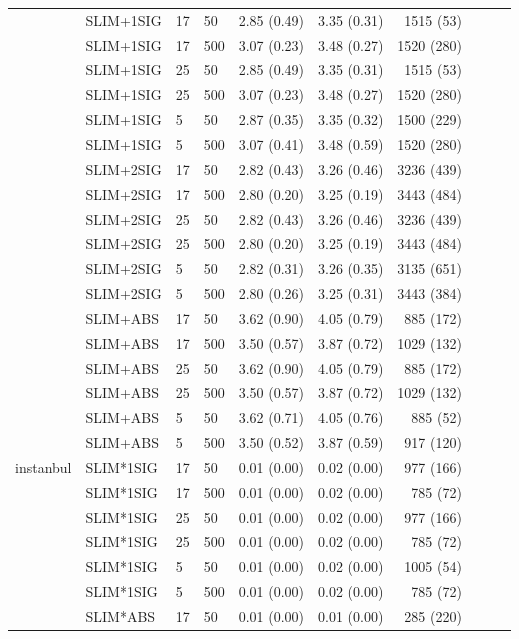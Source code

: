 \begin{longtable}{llllrrrrrr}
 & SLIM+1SIG & 17 & 50 & 2.85 (0.49) & 3.35 (0.31) & 1515 (53) \\
 & SLIM+1SIG & 17 & 500 & 3.07 (0.23) & 3.48 (0.27) & 1520 (280) \\
 & SLIM+1SIG & 25 & 50 & 2.85 (0.49) & 3.35 (0.31) & 1515 (53) \\
 & SLIM+1SIG & 25 & 500 & 3.07 (0.23) & 3.48 (0.27) & 1520 (280) \\
 & SLIM+1SIG & 5 & 50 & 2.87 (0.35) & 3.35 (0.32) & 1500 (229) \\
 & SLIM+1SIG & 5 & 500 & 3.07 (0.41) & 3.48 (0.59) & 1520 (280) \\
 & SLIM+2SIG & 17 & 50 & 2.82 (0.43) & 3.26 (0.46) & 3236 (439) \\
 & SLIM+2SIG & 17 & 500 & 2.80 (0.20) & 3.25 (0.19) & 3443 (484) \\
 & SLIM+2SIG & 25 & 50 & 2.82 (0.43) & 3.26 (0.46) & 3236 (439) \\
 & SLIM+2SIG & 25 & 500 & 2.80 (0.20) & 3.25 (0.19) & 3443 (484) \\
 & SLIM+2SIG & 5 & 50 & 2.82 (0.31) & 3.26 (0.35) & 3135 (651) \\
 & SLIM+2SIG & 5 & 500 & 2.80 (0.26) & 3.25 (0.31) & 3443 (384) \\
 & SLIM+ABS & 17 & 50 & 3.62 (0.90) & 4.05 (0.79) & 885 (172) \\
 & SLIM+ABS & 17 & 500 & 3.50 (0.57) & 3.87 (0.72) & 1029 (132) \\
 & SLIM+ABS & 25 & 50 & 3.62 (0.90) & 4.05 (0.79) & 885 (172) \\
 & SLIM+ABS & 25 & 500 & 3.50 (0.57) & 3.87 (0.72) & 1029 (132) \\
 & SLIM+ABS & 5 & 50 & 3.62 (0.71) & 4.05 (0.76) & 885 (52) \\
 & SLIM+ABS & 5 & 500 & 3.50 (0.52) & 3.87 (0.59) & 917 (120) \\
\midrule
instanbul & SLIM*1SIG & 17 & 50 & 0.01 (0.00) & 0.02 (0.00) & 977 (166) \\
 & SLIM*1SIG & 17 & 500 & 0.01 (0.00) & 0.02 (0.00) & 785 (72) \\
 & SLIM*1SIG & 25 & 50 & 0.01 (0.00) & 0.02 (0.00) & 977 (166) \\
 & SLIM*1SIG & 25 & 500 & 0.01 (0.00) & 0.02 (0.00) & 785 (72) \\
 & SLIM*1SIG & 5 & 50 & 0.01 (0.00) & 0.02 (0.00) & 1005 (54) \\
 & SLIM*1SIG & 5 & 500 & 0.01 (0.00) & 0.02 (0.00) & 785 (72) \\
 & SLIM*ABS & 17 & 50 & 0.01 (0.00) & 0.01 (0.00) & 285 (220) \\

\end{longtable}
